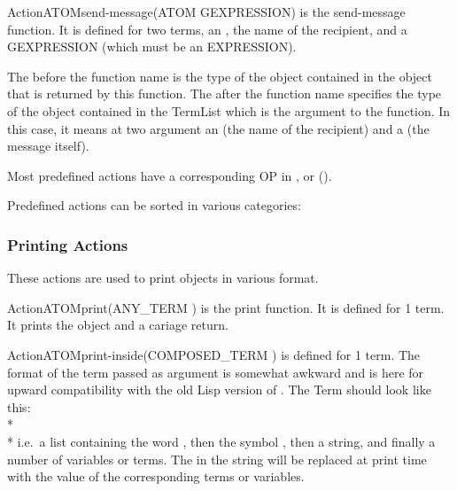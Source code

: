 \begin{typeefa}{Action}{ATOM}{send-message}{(ATOM GEXPRESSION)}
is the send-message function. It is defined for two terms, an , the
name of the recipient, and a GEXPRESSION (which must be an EXPRESSION).
\end{typeefa}

The  before the function name  is the type of the
object contained in the  object that is returned by this
 function.  The  after the function
name specifies the type of the object contained in the TermList which is the
argument to the  function. In this case, it means at two
argument an  (the name of the recipient) and a 
(the message itself).

Most predefined actions have a corresponding OP in ,
 or  ().

Predefined actions can be sorted in various categories:



\subsubsection{Printing Actions}

These actions are used to print objects in various format.

\begin{typeefa}{Action}{ATOM}{print}{(ANY\_TERM )} is the print
function. It is defined for 1 term. It prints the object and a cariage return.
\end{typeefa}

\begin{typeefa}{Action}{ATOM}{print-inside}{(COMPOSED\_TERM )}
is defined for 1 term. The format of the term passed as argument is somewhat
awkward and is here for upward compatibility with the old Lisp version of
\OPRS{}. The Term should look like this: \\*
\\*
i.e.\ a list containing the word , then the symbol
, then a string, and finally a number of variables or terms.
The  in the string will be replaced at print time with the value of
the corresponding terms or variables.
\end{typeefa}

